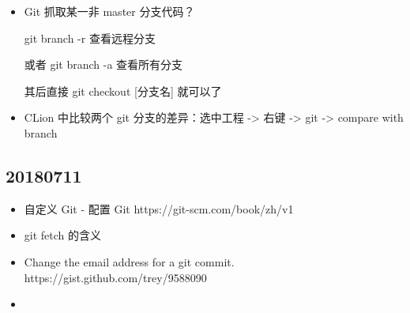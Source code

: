 \begin{itemize}
    \item Git 抓取某一非 master 分支代码？

    git branch -r 查看远程分支

    或者 git branch -a 查看所有分支

    其后直接 git checkout [分支名] 就可以了

    \item CLion 中比较两个 git 分支的差异：选中工程 -> 右键 -> git -> compare with branch
\end{itemize}

\subsection{20180711}\label{subsec:date-20180711}

\begin{itemize}
	\item 自定义 Git - 配置 Git https://git-scm.com/book/zh/v1
    \item git fetch 的含义
    \item Change the email address for a git commit. https://gist.github.com/trey/9588090
    \item 
\end{itemize}



\endinput
